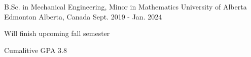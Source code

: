 

\begin{cventries}

  \cventry
    {B.Sc. in Mechanical Engineering, Minor in Mathematics} %
    {University of Alberta} %
    {Edmonton Alberta, Canada} %
    {Sept. 2019 - Jan. 2024} %
    {
      \begin{cvitems} %
        \item Will finish upcoming fall semester
        \item Cumalitive GPA 3.8
      \end{cvitems}
    }

\end{cventries}
